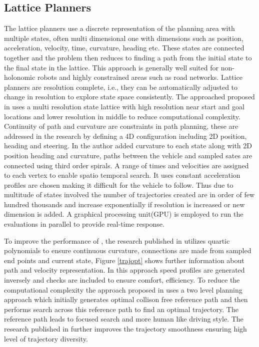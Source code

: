 \subsection{Lattice Planners}
\label{rw_lattice_planners}
The lattice planners use a discrete representation of the planning area with multiple states, often multi dimensional one with dimensions such as position, acceleration, velocity, time, curvature, heading etc. These states are connected together and the problem then reduces to finding a path from the initial state to the final state in the lattice. This approach is generally well suited for non-holonomic robots and highly constrained areas such as road networks\cite{lattice_1}. Lattice planners are resolution complete, i.e., they can be automatically adjusted to change in resolution to explore state space consistently. The approached proposed in \cite{lattice_1} uses a multi resolution state lattice with high resolution near start and goal locations and lower resolution in middle to reduce computational complexity. Continuity of path and curvature are constraints in path planning, these are addressed in the research \cite{lattice_2} by defining a 4D configuration including 2D position, heading and steering. In \cite{cmu_parallel_thesis} the author added curvature to each state along with 2D position heading and curvature, paths between the vehicle and sampled sates are connected using third order spirals. A range of times and velocities are assigned to each vertex to enable spatio temporal search. It uses constant acceleration profiles are chosen making it difficult for the vehicle to follow. Thus due to multitude of states involved the number of trajectories created are in order of few hundred thousands and increase exponentially if resolution is increased or new dimension is added. A graphical processing unit(GPU) is employed to run the evaluations in parallel to provide real-time response. 

To improve the performance of \cite{cmu_parallel_thesis}, the research published in \cite{traj_planner_optimization} utilizes quartic polynomials to ensure continuous curvature, connections are made from sampled end points and current state, Figure \ref{trajopt} shows further information about path and velocity representation. In this approach speed profiles are generated inversely and checks are included to ensure comfort, efficiency. To reduce the computational complexity the approach proposed in \cite{traj_smoothing} uses a two level planning approach which initially generates optimal collison free reference path and then performs search across this reference path to find an optimal trajectory. The reference path leads to focused search and more human like driving style. The research published in \cite{diss_shui_phd_thesis} further improves the trajectory smoothness ensuring high level of trajectory diversity. 

